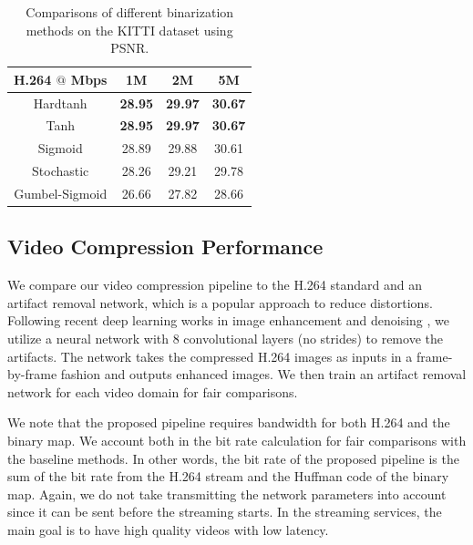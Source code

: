 \documentclass[letterpaper]{article} %
\begin{document}
	\begin{table}[t]
		\caption{Comparisons of different binarization methods on the KITTI dataset using PSNR.
		}
		\centering
		\begin{tabular}{cccc}
			\toprule
			H.264 $@$ Mbps & 1M & 2M & 5M \\
			\hline

			Hardtanh & \textbf{28.95} & \textbf{29.97} & \textbf{30.67} \\
			\hline

			Tanh & \textbf{28.95} & \textbf{29.97} & \textbf{30.67} \\
			\hline

			Sigmoid & 28.89 & 29.88 & 30.61 \\
			\hline

			Stochastic & 28.26 & 29.21 & 29.78 \\
			\hline

			Gumbel-Sigmoid & 26.66 & 27.82 & 28.66 \\
			\bottomrule
		\end{tabular}
		\label{tab:binary_psnr}
	\end{table}

	\subsection{Video Compression Performance}

	We compare our video compression pipeline to the H.264 standard and an artifact removal network, which is a popular approach to reduce distortions. Following recent deep learning works in image enhancement and denoising \cite{Kim_CVPR_2016,Zhang_TIP_2017}, we utilize a neural network with 8 convolutional layers (no strides) to remove the artifacts. The network takes the compressed H.264 images as inputs in a frame-by-frame fashion and outputs enhanced images. We then train an artifact removal network for each video domain for fair comparisons.

	We note that the proposed pipeline requires bandwidth for both H.264 and the binary map. We account both in the bit rate calculation for fair comparisons with the baseline methods. In other words, the bit rate of the proposed pipeline is the sum of the bit rate from the H.264 stream and the Huffman code of the binary map. Again, we do not take transmitting the network parameters into account since it can be sent before the streaming starts. In the streaming services, the main goal is to have high quality videos with low latency.
\end{document}
